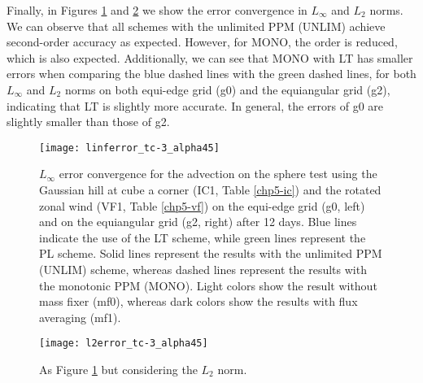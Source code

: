 \newpage
Finally, in Figures \ref{chp-advcs-sec-exp-adv2-linf} and \ref{chp-advcs-sec-exp-adv2-l2} we show the error convergence in $L_{\infty}$ and $L_{2}$ norms.
We can observe that all schemes with the unlimited PPM (UNLIM) achieve second-order accuracy as expected.
However, for MONO, the order is reduced, which is also expected.
Additionally, we can see that MONO with LT has smaller errors when comparing the blue dashed lines with the green dashed lines, 
for both $L_{\infty}$ and $L_{2}$ norms on both equi-edge grid (g0) and the equiangular grid (g2), indicating that LT is slightly more accurate.
In general, the errors of g0 are slightly smaller than those of g2.
\begin{figure}[!htb]
	\centering
	\texttt{[image: linferror\_tc-3\_alpha45]}
	\caption{
$L_{\infty}$ error convergence for the advection on the sphere test using the Gaussian hill at cube a corner (IC1, Table \ref{chp5-ic}) and 
the rotated zonal wind  (VF1, Table \ref{chp5-vf}) on the equi-edge grid (g0, left) 
and on the equiangular grid (g2, right) after 12 days.
Blue lines indicate the use of the LT scheme, while green lines represent the PL scheme.
Solid lines represent the results with the unlimited PPM (UNLIM) scheme, whereas dashed lines represent the results with the monotonic PPM (MONO).
Light colors show the result without mass fixer (mf0), whereas dark colors show the results with flux averaging (mf1).\label{chp-advcs-sec-exp-adv2-linf}}
\end{figure}

\begin{figure}[!htb]
	\centering
	\texttt{[image: l2error\_tc-3\_alpha45]}
	\caption{As Figure \ref{chp-advcs-sec-exp-adv2-linf} but considering the $L_2$ norm. \label{chp-advcs-sec-exp-adv2-l2}}
\end{figure}

\newpage

